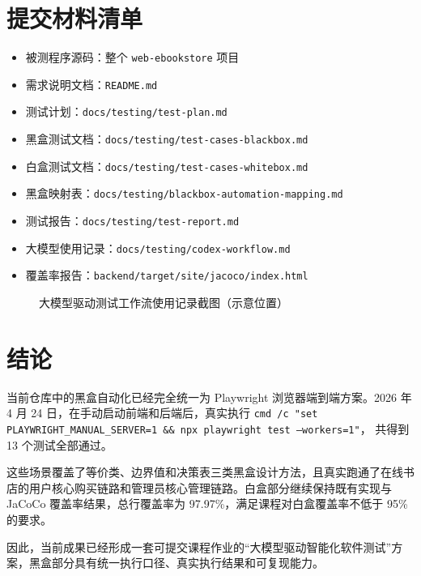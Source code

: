 \documentclass[UTF8,a4paper,12pt]{ctexart}
\begin{document}
\section{提交材料清单}

\begin{itemize}
  \item 被测程序源码：整个 \texttt{web-ebookstore} 项目
  \item 需求说明文档：\texttt{README.md}
  \item 测试计划：\texttt{docs/testing/test-plan.md}
  \item 黑盒测试文档：\texttt{docs/testing/test-cases-blackbox.md}
  \item 白盒测试文档：\texttt{docs/testing/test-cases-whitebox.md}
  \item 黑盒映射表：\texttt{docs/testing/blackbox-automation-mapping.md}
  \item 测试报告：\texttt{docs/testing/test-report.md}
  \item 大模型使用记录：\texttt{docs/testing/codex-workflow.md}
  \item 覆盖率报告：\texttt{backend/target/site/jacoco/index.html}
\end{itemize}

\begin{figure}[H]
  \centering
  \caption{大模型驱动测试工作流使用记录截图（示意位置）}
\end{figure}

\section{结论}

当前仓库中的黑盒自动化已经完全统一为 Playwright 浏览器端到端方案。2026 年 4 月 24 日，在手动启动前端和后端后，真实执行
\texttt{cmd /c "set PLAYWRIGHT\_MANUAL\_SERVER=1 \&\& npx playwright test --workers=1"}，
共得到 13 个测试全部通过。

这些场景覆盖了等价类、边界值和决策表三类黑盒设计方法，且真实跑通了在线书店的用户核心购买链路和管理员核心管理链路。白盒部分继续保持既有实现与 JaCoCo 覆盖率结果，总行覆盖率为 97.97\%，满足课程对白盒覆盖率不低于 95\% 的要求。

因此，当前成果已经形成一套可提交课程作业的“大模型驱动智能化软件测试”方案，黑盒部分具有统一执行口径、真实执行结果和可复现能力。
\end{document}

